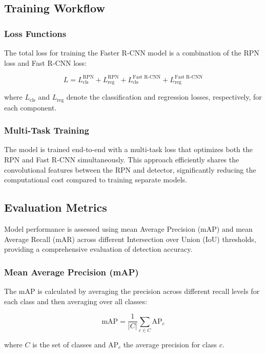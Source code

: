 \documentclass[12pt,oneside]{book} %
\begin{document}
\subsection{Training Workflow}
\subsubsection{Loss Functions}
The total loss for training the Faster R-CNN model is a combination of the RPN
loss and Fast R-CNN loss:

\begin{equation}
    L = L_{\text{cls}}^{\text{RPN}} + L_{\text{reg}}^{\text{RPN}} + L_{\text{cls}}^{\text{Fast R-CNN}} + L_{\text{reg}}^{\text{Fast R-CNN}}
\end{equation}

where $L_{\text{cls}}$ and $L_{\text{reg}}$ denote the classification and
regression losses, respectively, for each component.

\subsubsection{Multi-Task Training}
The model is trained end-to-end with a multi-task loss that optimizes both the
RPN and Fast R-CNN simultaneously. This approach efficiently shares the
convolutional features between the RPN and detector, significantly reducing the
computational cost compared to training separate models.

\subsection{Evaluation Metrics}
Model performance is assessed using mean Average Precision (mAP) and mean
Average Recall (mAR) across different Intersection over Union (IoU) thresholds,
providing a comprehensive evaluation of detection accuracy.

\subsubsection{Mean Average Precision (mAP)}
The mAP is calculated by averaging the precision across different recall levels
for each class and then averaging over all classes:

\begin{equation}
    \text{mAP} = \frac{1}{|C|} \sum_{c \in C} \text{AP}_c
\end{equation}

where $C$ is the set of classes and $\text{AP}_c$ the average precision for
class $c$.
\end{document}
